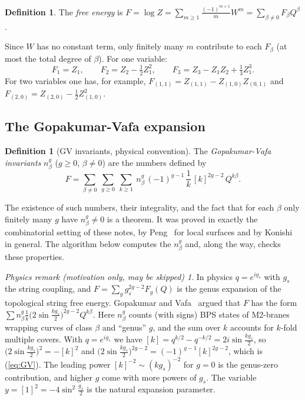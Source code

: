 \documentclass[11pt]{article}
\theoremstyle{plain}
\theoremstyle{definition}
\newtheorem{definition}[theorem]{Definition}
\theoremstyle{remark}
\newtheorem*{physrem}{Physics remark (motivation only, may be skipped)}
\begin{document}
\begin{definition}
The \textit{free energy} is $F=\log Z=\sum_{m\ge1}\frac{(-1)^{m+1}}{m}W^m=\sum_{\beta\ne0}F_\beta Q^\beta$.
\end{definition}

Since $W$ has no constant term, only finitely many $m$ contribute to each $F_\beta$ (at most the
total degree of $\beta$). For one variable:
\begin{equation}
F_1=Z_1,\qquad F_2=Z_2-\tfrac12Z_1^2,\qquad F_3=Z_3-Z_1Z_2+\tfrac13Z_1^3 .
\end{equation}
For two variables one has, for example, $F_{(1,1)}=Z_{(1,1)}-Z_{(1,0)}Z_{(0,1)}$ and
$F_{(2,0)}=Z_{(2,0)}-\frac12Z_{(1,0)}^2$.

\subsection{The Gopakumar-Vafa expansion}

\begin{definition}[GV invariants, physical convention]
The \textit{Gopakumar-Vafa invariants} $n^g_\beta$ ($g\ge0$, $\beta\ne0$) are the numbers defined by
\begin{equation}\label{eq:GV}
F=\sum_{\beta\ne0}\ \sum_{g\ge0}\ \sum_{k\ge1}\ n^g_\beta\,(-1)^{g-1}\,\frac1k\,[k]^{2g-2}\,Q^{k\beta}.
\end{equation}
\end{definition}

The existence of such numbers, their integrality, and the fact that for each $\beta$ only
finitely many $g$ have $n^g_\beta\neq0$ is a theorem. It was proved in exactly the combinatorial
setting of these notes, by Peng~\cite{Peng} for local surfaces and by Konishi~\cite{Kon} in
general. The algorithm below
computes the $n^g_\beta$ and, along the way, checks these properties.

\begin{physrem}
In physics $q=e^{ig_s}$ with $g_s$ the string coupling, and $F=\sum_g g_s^{2g-2}F_g(Q)$ is the
genus expansion of the topological string free energy. Gopakumar and Vafa~\cite{GV} argued that
$F$ has the form $\sum n^g_\beta\frac1k\big(2\sin\frac{kg_s}2\big)^{2g-2}Q^{k\beta}$. Here
$n^g_\beta$ counts (with signs) BPS states of M2-branes wrapping curves of class $\beta$ and
``genus'' $g$, and the sum over $k$ accounts for $k$-fold multiple covers. With $q=e^{ig_s}$ we
have $[k]=q^{k/2}-q^{-k/2}=2i\sin\frac{kg_s}2$, so $\big(2\sin\frac{kg_s}2\big)^2=-[k]^2$ and
$\big(2\sin\frac{kg_s}2\big)^{2g-2}=(-1)^{g-1}[k]^{2g-2}$, which is (\ref{eq:GV}). The leading power
$[k]^{-2}\sim(kg_s)^{-2}$ for $g=0$ is the genus-zero contribution, and higher $g$ come with more
powers of $g_s$. The variable $y=[1]^2=-4\sin^2\frac{g_s}2$ is the natural expansion parameter.
\end{physrem}
\end{document}
